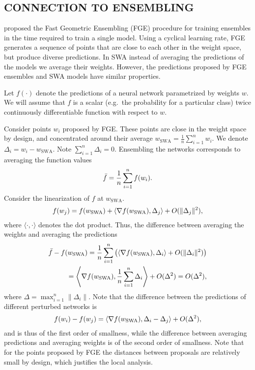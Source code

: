 \documentclass[letterpaper]{article}
\begin{document}
\subsection{CONNECTION TO ENSEMBLING}
\label{sec:ensembling}

\citet{garipov2018} proposed the Fast Geometric Ensembling (FGE) procedure 
for training ensembles in the time required to train a single model. Using a
cyclical learning rate, FGE generates a sequence of points
that are close to each other in the weight space, but produce diverse 
predictions. In SWA instead of averaging the predictions of the models we 
average their weights. However, the predictions proposed by FGE ensembles
and SWA models have similar properties. 

Let $f(\cdot)$ denote the predictions of a neural network parametrized by
weights $w$.
We will
assume that $f$ is a scalar (e.g.\ the probability for a particular class)
twice continuously differentiable function with respect to $w$. 

Consider points $w_i$ proposed by FGE. These points are close in the weight space by 
design, and 
concentrated around their 
average $w_{\text{SWA}} = \frac 1 n \sum_{i=1}^n w_i$. We denote
$\Delta_i = w_i - w_{\text{SWA}}$. Note $\sum_{i=1}^n \Delta_i = 0$.
Ensembling the networks corresponds to averaging
the function values
\begin{align}
  \notag
  \bar{f} = \frac 1 n \sum_{i=1}^n f(w_i).
\end{align}
Consider the linearization of $f$ at $w_{\text{SWA}}$.
\begin{align}
  \notag
  f(w_j) = f(w_{\text{SWA}}) +
  \left \langle \nabla f(w_{\text{SWA}}), \Delta_j \right\rangle + 
  O(\|\Delta_j\|^2),
\end{align}
where $\langle \cdot, \cdot \rangle$ denotes the dot product.
Thus, the difference between averaging the weights and averaging the
predictions
\begin{align}
  \notag
  \bar{f} - f(w_{\text{SWA}}) = 
  \frac{1}{n} \sum_{i=1}^n 
  \left( \left \langle \nabla f(w_{\text{SWA}}),  \Delta_i \right\rangle + 
  O(\|\Delta_i\|^2)\right) \\ 
  = \left \langle \nabla f(w_{\text{SWA}}), \frac{1}{n} \sum_{i=1}^n \Delta_i \right\rangle + 
  O(\Delta^2)
  = O(\Delta^2), \notag
\end{align}
where $\Delta = \max_{i=1}^n \|\Delta_i\|$.
Note that the difference between the predictions of different perturbed networks
is
\begin{align}
  \notag
  f(w_i) - f(w_j) = 
  \langle \nabla f(w_{\text{SWA}}), \Delta_i - \Delta_j \rangle + O(\Delta^2),
\end{align}
and is thus of the first order of smallness, while the difference between
averaging predictions and averaging weights is of the second order of
smallness. Note that for the points proposed by FGE the distances
between proposals are relatively small by design, which justifies 
the local analysis.
\end{document}
